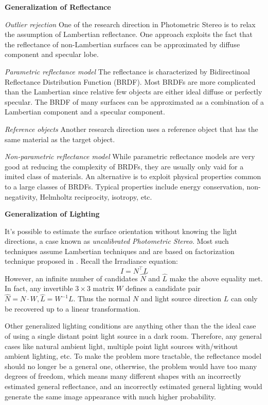 \textbf{Generalization of Reflectance}

\textit{Outlier rejection}
One of the research direction in Photometric Stereo is to relax the assumption of Lambertian reflectance. One approach exploits the fact that the reflectance of non-Lambertian surfaces can be approximated by diffuse component and specular lobe.

\textit{Parametric reflectance model} The reflectance is characterized by Bidirectinoal Reflectance Distribution Function (BRDF). Most BRDFs are more complicated than the Lambertian since relative few objects are either ideal diffuse or perfectly specular. The BRDF of many surfaces can be approximated as a combination of a Lambertian component and a specular component.

\textit{Reference objects}
Another research direction uses a reference object that has the same material as the target object.

\textit{Non-parametric reflectance model} While parametric reflectance models are very good at reducing the complexity of BRDFs, they are usually only vaid for a imited class of materials. An alternative is to exploit physical properties common to a large classes of BRDFs. Typical properties include energy conservation, non-negativity, Helmholtz reciprocity, isotropy, etc.

\textbf{Generalization of Lighting}

It's possible to estimate the surface orientation without knowing the light directions, a case known as \textit{uncalibrated Photometric Stereo}. Most such techniques assume Lambertian techniques and are based on factorization technique proposed in \cite{hayakawa1994photometric}. Recall the Irradiance equation:
$$
I=N^\top L
$$
However, an infinite number of candidates $\hat{N}$ and $\hat{L}$ make the above equality met. In fact, any invertible $3\times 3$ matrix $W$ defines a candidate pair $\hat{N} = N\cdot W, \hat{L}=W^{-1}L$. Thus the normal $N$ and light source direction $L$ can only be recovered up to a linear transformation.

Other generalized lighting conditions are anything other than the the ideal case of using a single distant point light source in a dark room. Therefore, any general cases like natural ambient light, multiple point light sources with/without ambient lighting, etc. To make the problem more tractable, the reflectance model should no longer be a general one, otherwise, the problem would have too many degrees of freedom, which means many different shapes with an incorrectly estimated general reflectance, and an incorrectly estimated general lighting would generate the same image appearance with much higher probability.

